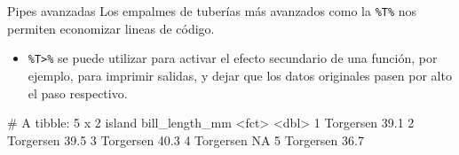 \documentclass[
  ignorenonframetext,
  aspectratio=169]{beamer}
\newenvironment{Shaded}{\begin{snugshade}}{\end{snugshade}}
\newcommand{\AttributeTok}[1]{\textcolor[rgb]{0.77,0.63,0.00}{#1}}
\newcommand{\DecValTok}[1]{\textcolor[rgb]{0.00,0.00,0.81}{#1}}
\newcommand{\FunctionTok}[1]{\textcolor[rgb]{0.00,0.00,0.00}{#1}}
\newcommand{\NormalTok}[1]{#1}
\newcommand{\SpecialCharTok}[1]{\textcolor[rgb]{0.00,0.00,0.00}{#1}}
\newcommand{\StringTok}[1]{\textcolor[rgb]{0.31,0.60,0.02}{#1}}
\providecommand{\tightlist}{%
  \setlength{\itemsep}{0pt}\setlength{\parskip}{0pt}}
\let\oldverbatim\verbatim
\let\endoldverbatim\endverbatim
\renewenvironment{verbatim}{\tiny\oldverbatim}{\endoldverbatim}
\begin{document}
\begin{frame}[fragile]{Pipes avanzadas}
\protect\hypertarget{pipes-avanzadas}{}
Los empalmes de tuberías más avanzados como la \texttt{\%T\%} nos
permiten economizar lineas de código.

\begin{itemize}
\tightlist
\item
  \texttt{\%T\textgreater{}\%} se puede utilizar para activar el efecto
  secundario de una función, por ejemplo, para imprimir salidas, y dejar
  que los datos originales pasen por alto el paso respectivo.
\end{itemize}

\begin{Shaded}
\end{Shaded}

\begin{verbatim}
# A tibble: 5 x 2
  island    bill_length_mm
  <fct>              <dbl>
1 Torgersen           39.1
2 Torgersen           39.5
3 Torgersen           40.3
4 Torgersen           NA  
5 Torgersen           36.7
\end{verbatim}

\begin{verbatim}
[1] 38.9
\end{verbatim}
\end{frame}
\end{document}
